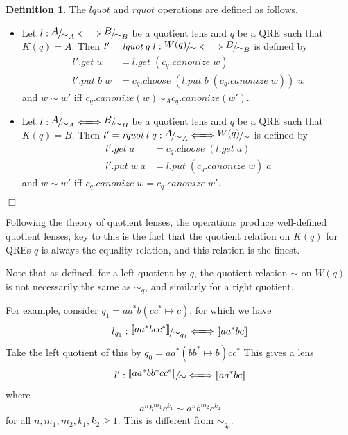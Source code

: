 \documentclass[a4paper,11pt] {article}
\theoremstyle{definition}
\newtheorem{definition}[theorem]{Definition}
\newcommand{\lget}[1]{\textit{$#1$.get}}
\newcommand{\lput}[1]{\textit{$#1$.put}}
\newcommand{\lquot}{\textit{lquot}}
\newcommand{\rquot}{\textit{rquot}}
\newcommand{\lcanonize}[1]{\textit{$#1$.canonize}}
\newcommand{\lchoose}[1]{\textit{$#1$.choose}}
\newcommand{\lensbetween}[1]{\xLongleftrightarrow{#1}}
\newcommand{\niceFrac}[2]{%
    \raise.5ex\hbox{$#1$}%
    \kern-.1em/\kern-.15em%
    \lower.25ex\hbox{$#2$}}
\begin{document}
\begin{definition}
  The $\lquot$ and $\rquot$ operations are defined as follows.
  \begin{itemize}
  \item Let $l: \niceFrac{A}{\sim_A} \lensbetween{}
    \niceFrac{B}{\sim_B}$ be a quotient lens and
    $q$ be a QRE such that $K(q) = A$.
    Then
    $l' = \lquot \; q \; l: \niceFrac{W(q)}{\sim} \lensbetween{}
    \niceFrac{B}{\sim_B}$
    is defined by
    \begin{align*}
      \lget{l'} \; w &= \lget{l} \; (\lcanonize{c_q} \; w) \\
      \lput{l'} \; b \; w &=
      \lchoose{c_q} \; (\lput{l} \; b \; (\lcanonize{c_q} \; w)) \; w
    \end{align*}
    and $w \sim w'$ iff $\lcanonize{c_q}(w) \sim_A \lcanonize{c_q}(w')$.
    
  \item Let $l: \niceFrac{A}{\sim_A} \lensbetween{}
    \niceFrac{B}{\sim_B}$
    be a quotient lens and
    $q$ be a QRE such that $K(q) = B$.
    Then $l' = \rquot \; l \; q: \niceFrac{A}{\sim_A} \lensbetween{}
    \niceFrac{W(q)}{\sim}$
    is defined by
    \begin{align*}
      \lget{l'} \; a &= \lchoose{c_q} \; (\lget{l} \; a) \\
      \lput{l'} \; w \; a &= \lput{l} \; (\lcanonize{c_q} \; w) \; a
    \end{align*}
    and $w \sim w'$ iff $\lcanonize{c_q} \; w = \lcanonize{c_q} \; w'$.
  \end{itemize}
  \begin{flushright} $\Box$ \end{flushright}
\end{definition}
Following the theory of quotient lenses, the operations produce
well-defined quotient lenses; key to this is the fact that the
quotient relation on $K(q)$ for QREs $q$ is always the equality
relation, and this relation is the finest.

Note that as defined, for a left quotient by $q$, the quotient
relation $\sim$ on $W(q)$ is not necessarily the same as
$\sim_q$, and similarly for a right quotient.

For example, consider $q_1 = aa^* b (cc^* \mapsto c)$, for which
we have
\begin{align*}
  l_{q_1}: \niceFrac{\llbracket aa^*bcc^* \rrbracket}{\sim_{q_1}} \lensbetween{}
  \llbracket aa^*bc \rrbracket
\end{align*}
Take the left quotient of this by $q_0 = aa^* (bb^* \mapsto b) cc^*$
This gives a lens
\begin{align*}
  l': \niceFrac{\llbracket aa^*bb^*cc^*\rrbracket}{\sim} \lensbetween{}
  \llbracket aa^*bc \rrbracket
\end{align*}
where
\begin{align*}
  a^n b^{m_1} c^{k_1} \sim a^n b^{m_2} c^{k_2}
\end{align*}
for all $n, m_1, m_2, k_1, k_2 \geq 1$.
This is different from $\sim_{q_0}$.
\end{document}
